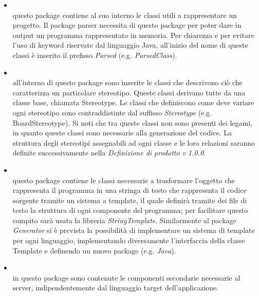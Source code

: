 \begin{itemize}
\begin{itemize}
\item \hyperref[\nogloxy{SWEDesigner::Server::Project}]{}\\
questo package contiene al suo interno le classi utili a rappresentare un progetto. Il package parser necessita di questo package per poter dare in output un programma rappresentato in memoria. Per chiarezza e per evitare l'uso di keyword riservate dal linguaggio Java, all'inizio del nome di queste classi è inserito il prefisso \emph{Parsed} (e.g. \emph{ParsedClass}).
\item \hyperref[\nogloxy{SWEDesigner::Server::Stereotype}]{}\\
all'interno di questo package sono inserite le classi che descrivono ciò che caratterizza un particolare stereotipo. Queste classi derivano tutte da una classe base, chiamata Stereotype. Le classi che definiscono come deve variare ogni stereotipo sono contraddistinte dal suffisso \emph{Stereotype} (e.g. BoardStereotype). Si noti che tra queste classi non sono presenti dei legami, in quanto queste classi sono necessarie alla generazione del codice. La struttura degli stereotipi assegnabili ad ogni classe e le loro relazioni saranno definite successivamente nella \emph{Definizione di prodotto v 1.0.0}.
\item \hyperref[\nogloxy{SWEDesigner::Server::Template}]{}\\
questo package contiene le classi necessarie a trasformare l'oggetto che rappresenta il programma in una stringa di testo che rappresenta il codice sorgente tramite un sistema a template, il quale definirà tramite dei file di testo la struttura di ogni componente del programma; per facilitare questo compito sarà usata la libreria \emph{StringTemplate}. Similarmente al package \emph{Generator} si è prevista la possibilità di implementare un sistema di template per ogni linguaggio, implementando diversamente l'interfaccia della classe Template e definendo un nuovo package (e.g. \emph{Java}).
\item \hyperref[\nogloxy{SWEDesigner::Server::Utility}]{}\\
in questo package sono contenute le componenti secondarie necessarie al server, indipendentemente dal linguaggio target dell'applicazione.
\end{itemize}
\end{itemize}

\subsection{}
\label{\nogloxy{SWEDesigner::Server::Compiler}}
